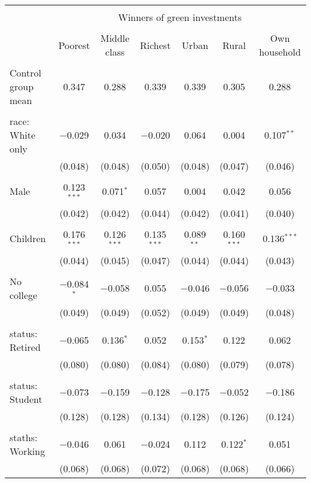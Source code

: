 
\begin{tabular}{@{\extracolsep{5pt}}lcccccc} 
\\[-1.8ex]\hline 
\hline \\[-1.8ex] 
 & \multicolumn{6}{c}{Winners of green investments} \\ 
\cline{2-7} 
\\[-1.8ex] & Poorest & Middle class & Richest & Urban & Rural & Own household \\ 
\hline \\[-1.8ex] 
 Control group mean & 0.347 & 0.288 & 0.339 & 0.339 & 0.305 & 0.288  \\ \hline \\[-1.8ex] race: White only & $-$0.029 & 0.034 & $-$0.020 & 0.064 & 0.004 & 0.107$^{**}$ \\ 
  & (0.048) & (0.048) & (0.050) & (0.048) & (0.047) & (0.046) \\ 
  & & & & & & \\ 
 Male & 0.123$^{***}$ & 0.071$^{*}$ & 0.057 & 0.004 & 0.042 & 0.056 \\ 
  & (0.042) & (0.042) & (0.044) & (0.042) & (0.041) & (0.040) \\ 
  & & & & & & \\ 
 Children & 0.176$^{***}$ & 0.126$^{***}$ & 0.135$^{***}$ & 0.089$^{**}$ & 0.160$^{***}$ & 0.136$^{***}$ \\ 
  & (0.044) & (0.045) & (0.047) & (0.044) & (0.044) & (0.043) \\ 
  & & & & & & \\ 
 No college & $-$0.084$^{*}$ & $-$0.058 & 0.055 & $-$0.046 & $-$0.056 & $-$0.033 \\ 
  & (0.049) & (0.049) & (0.052) & (0.049) & (0.049) & (0.048) \\ 
  & & & & & & \\ 
 status: Retired & $-$0.065 & 0.136$^{*}$ & 0.052 & 0.153$^{*}$ & 0.122 & 0.062 \\ 
  & (0.080) & (0.080) & (0.084) & (0.080) & (0.079) & (0.078) \\ 
  & & & & & & \\ 
 status: Student & $-$0.073 & $-$0.159 & $-$0.128 & $-$0.175 & $-$0.052 & $-$0.186 \\ 
  & (0.128) & (0.128) & (0.134) & (0.128) & (0.126) & (0.124) \\ 
  & & & & & & \\ 
 staths: Working & $-$0.046 & 0.061 & $-$0.024 & 0.112 & 0.122$^{*}$ & 0.051 \\ 
  & (0.068) & (0.068) & (0.072) & (0.068) & (0.068) & (0.066) \\ 

\end{tabular}
